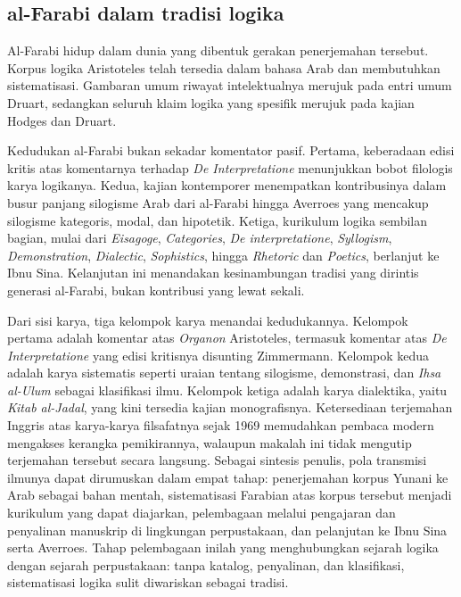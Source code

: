 \documentclass[12pt,a4paper]{article}
\begin{document}
\subsection{al-Farabi dalam tradisi logika}

Al-Farabi hidup dalam dunia yang dibentuk gerakan penerjemahan tersebut. Korpus logika Aristoteles telah tersedia dalam bahasa Arab dan membutuhkan sistematisasi. Gambaran umum riwayat intelektualnya merujuk pada entri umum Druart, sedangkan seluruh klaim logika yang spesifik merujuk pada kajian Hodges dan Druart.\autocite{druart2024}\autocite{hodges-druart2019}

Kedudukan al-Farabi bukan sekadar komentator pasif. Pertama, keberadaan edisi kritis atas komentarnya terhadap \emph{De Interpretatione} menunjukkan bobot filologis karya logikanya.\autocite{zimmermann1981} Kedua, kajian kontemporer menempatkan kontribusinya dalam busur panjang silogisme Arab dari al-Farabi hingga Averroes yang mencakup silogisme kategoris, modal, dan hipotetik.\autocite{chatti2019} Ketiga, kurikulum logika sembilan bagian, mulai dari \emph{Eisagoge}, \emph{Categories}, \emph{De interpretatione}, \emph{Syllogism}, \emph{Demonstration}, \emph{Dialectic}, \emph{Sophistics}, hingga \emph{Rhetoric} dan \emph{Poetics}, berlanjut ke Ibnu Sina. Kelanjutan ini menandakan kesinambungan tradisi yang dirintis generasi al-Farabi, bukan kontribusi yang lewat sekali.\autocite{gutas2025}

Dari sisi karya, tiga kelompok karya menandai kedudukannya. Kelompok pertama adalah komentar atas \emph{Organon} Aristoteles, termasuk komentar atas \emph{De Interpretatione} yang edisi kritisnya disunting Zimmermann.\autocite{zimmermann1981} Kelompok kedua adalah karya sistematis seperti uraian tentang silogisme, demonstrasi, dan \emph{Ihsa al-Ulum} sebagai klasifikasi ilmu. Kelompok ketiga adalah karya dialektika, yaitu \emph{Kitab al-Jadal}, yang kini tersedia kajian monografisnya.\autocite{dipasquale2019} Ketersediaan terjemahan Inggris atas karya-karya filsafatnya sejak 1969 memudahkan pembaca modern mengakses kerangka pemikirannya, walaupun makalah ini tidak mengutip terjemahan tersebut secara langsung.\autocite{mahdi1969} Sebagai sintesis penulis, pola transmisi ilmunya dapat dirumuskan dalam empat tahap: penerjemahan korpus Yunani ke Arab sebagai bahan mentah, sistematisasi Farabian atas korpus tersebut menjadi kurikulum yang dapat diajarkan, pelembagaan melalui pengajaran dan penyalinan manuskrip di lingkungan perpustakaan, dan pelanjutan ke Ibnu Sina serta Averroes. Tahap pelembagaan inilah yang menghubungkan sejarah logika dengan sejarah perpustakaan: tanpa katalog, penyalinan, dan klasifikasi, sistematisasi logika sulit diwariskan sebagai tradisi.
\end{document}
